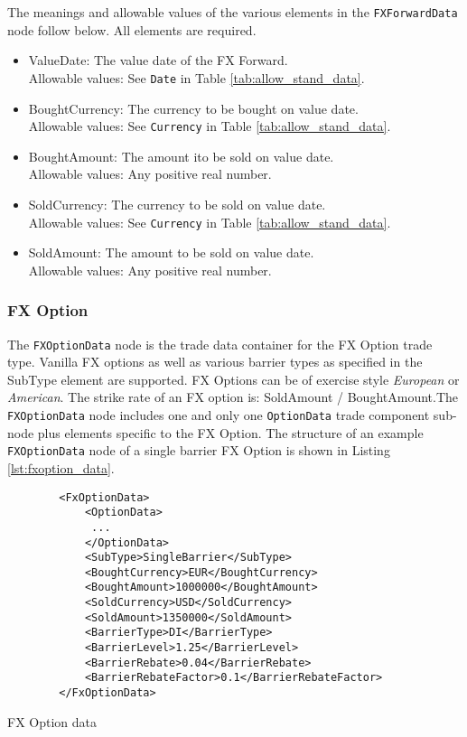 The meanings and allowable values of the various elements in the \lstinline!FXForwardData!  node follow below.  All elements are required.

\begin{itemize}
\item ValueDate: The value date of the FX Forward. \\ Allowable values:  See \lstinline!Date! in Table \ref{tab:allow_stand_data}.
\item BoughtCurrency: The currency to be bought on value date.  \\ Allowable values:  See \lstinline!Currency! in Table \ref{tab:allow_stand_data}.
\item BoughtAmount: The amount ito be sold on value date.  \\ Allowable values:  Any positive real number.
\item SoldCurrency: The currency to be sold on value date.  \\ Allowable values:  See \lstinline!Currency! in Table \ref{tab:allow_stand_data}.
\item SoldAmount: The amount to be sold on value date.  \\ Allowable values:  Any positive real number.

\end{itemize}


\subsubsection{FX Option}

The \lstinline!FXOptionData!  node is the trade data container for the FX Option trade type.  Vanilla FX options as well as various barrier types as specified in the SubType element are supported. FX Options can be of exercise style \emph{European} or \emph{American}. The strike rate of an FX option is: SoldAmount / BoughtAmount.The \lstinline!FXOptionData!  node includes one and only one  \lstinline!OptionData! trade component sub-node plus elements specific to the FX Option. The structure of an example \lstinline!FXOptionData!  node of a single barrier FX Option is shown in Listing \ref{lst:fxoption_data}.  

\begin{listing}[H]
\begin{verbatim}
        <FxOptionData>
            <OptionData>
             ...
            </OptionData>
            <SubType>SingleBarrier</SubType>
            <BoughtCurrency>EUR</BoughtCurrency>
            <BoughtAmount>1000000</BoughtAmount>
            <SoldCurrency>USD</SoldCurrency>
            <SoldAmount>1350000</SoldAmount>
            <BarrierType>DI</BarrierType>
            <BarrierLevel>1.25</BarrierLevel>
            <BarrierRebate>0.04</BarrierRebate>
            <BarrierRebateFactor>0.1</BarrierRebateFactor>
        </FxOptionData>
\end{verbatim}
\caption{FX Option data}
\label{lst:fxoption_data}
\end{listing}

